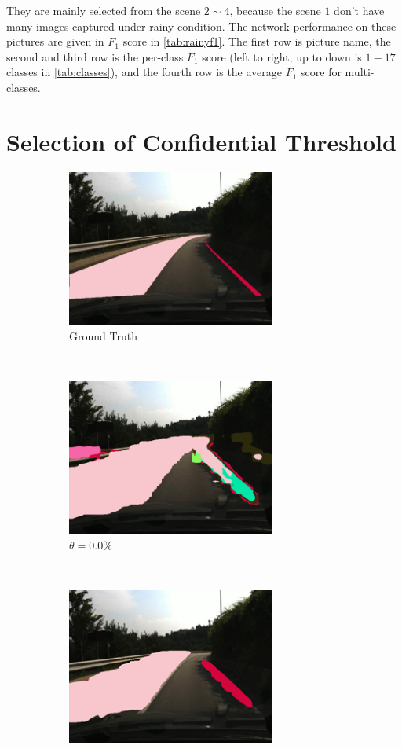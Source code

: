 \begin{spacing}{1.5}
They are mainly selected from the scene $2 \sim 4$, because the scene $1$ don't have many images captured under rainy condition. The network performance on these pictures are given in $F_1$ score in \autoref{tab:rainyf1}. The first row is picture name, the second and third row is the per-class $F_1$ score (left to right, up to down is $1-17$ classes in \autoref{tab:classes}), and the fourth row is the average $F_1$ score for multi-classes.


\section{Selection of Confidential Threshold}
\label{sec:EX_threshold}

\begin{figure}[!ht]
    \centering
    \begin{subfigure}[b]{0.49\textwidth}
        \centering
        \includegraphics[width=2.7in, fbox]{Chapter5/Picture3an.jpg}
        \caption{Ground Truth}
    \end{subfigure}%
    ~
    \begin{subfigure}[b]{0.49\textwidth}
        \centering
        \includegraphics[width=2.7in, fbox]{Chapter5/pic1conf0.png}
        \caption{$\theta = 0.0\%$}
    \end{subfigure}
    \\
    \begin{subfigure}[b]{0.49\textwidth}
        \centering
        \includegraphics[width=2.7in, fbox]{Chapter5/pic1conf31.png}

\end{subfigure}
\end{figure}
\end{spacing}
